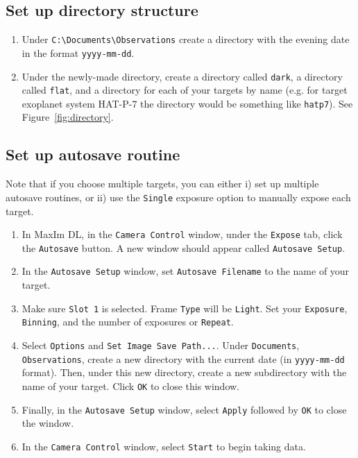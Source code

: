 \documentclass{article}
\begin{document}
	\subsection{Set up directory structure}
	\label{sec:set-up-directory-structure}
	
	\begin{enumerate}
		
		\item Under \texttt{C:\textbackslash Documents\textbackslash Observations} create a directory with the evening date in the format \texttt{yyyy-mm-dd}.
		
		\item Under the newly-made directory, create a directory called \texttt{dark}, a directory called \texttt{flat}, and a directory for each of your targets by name (e.g. for target exoplanet system HAT-P-7 the directory would be something like \texttt{hatp7}). See Figure~\ref{fig:directory}.
		
	\end{enumerate}
	
	\subsection{Set up autosave routine}
	\label{sec:set-up-autosave-routine}
	
	Note that if you choose multiple targets, you can either i) set up multiple autosave routines, or ii) use the \texttt{Single} exposure option to manually expose each target.
	
	\begin{enumerate}
		
		\item In MaxIm DL, in the \texttt{Camera Control} window, under the \texttt{Expose} tab, click the \texttt{Autosave} button. A new window should appear called \texttt{Autosave Setup}.
		
		\item In the \texttt{Autosave Setup} window, set \texttt{Autosave Filename} to the name of your target.
		
		\item Make sure \texttt{Slot 1} is selected. Frame \texttt{Type} will be \texttt{Light}. Set your \texttt{Exposure}, \texttt{Binning}, and the number of exposures or \texttt{Repeat}.
		
		\item Select \texttt{Options} and \texttt{Set Image Save Path...}. Under \texttt{Documents}, \texttt{Observations}, create a new directory with the current date (in \texttt{yyyy-mm-dd} format). Then, under this new directory, create a new subdirectory with the name of your target. Click \texttt{OK} to close this window.
		
		\item Finally, in the \texttt{Autosave Setup} window, select \texttt{Apply} followed by \texttt{OK} to close the window.
		
		\item In the \texttt{Camera Control} window, select \texttt{Start} to begin taking data.
		
	\end{enumerate}
\end{document}
